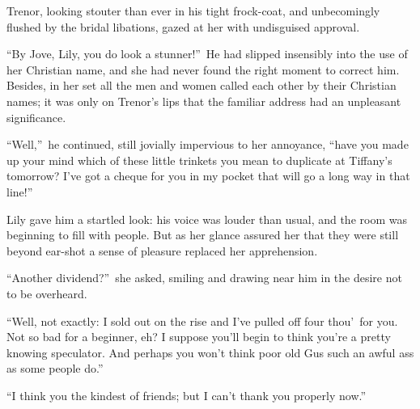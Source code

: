 \documentclass[12pt,a4paper]{book}
\begin{document}
Trenor, looking stouter than ever in his tight frock-coat, and
unbecomingly flushed by the bridal libations, gazed at her with
undisguised approval.





``By Jove, Lily, you do look a stunner!''\ He had slipped insensibly
into the use of her Christian name, and she had never found the
right moment to correct him. Besides, in her set all the men and
women called each other by their Christian names; it was only on
Trenor's lips that the familiar address had an unpleasant
significance.





``Well,''\ he continued, still jovially impervious to her annoyance,
``have you made up your mind which of these little trinkets you
mean to duplicate at Tiffany's tomorrow? I've got a cheque for
you in my pocket that will go a long way in that line!''





Lily gave him a startled look: his voice was louder than usual,
and the room was beginning to fill with people. But as her glance
assured her that they were still beyond ear-shot a sense of
pleasure replaced her apprehension.





``Another dividend?''\ she asked, smiling and drawing near him in
the desire not to be overheard.





``Well, not exactly: I sold out on the rise and I've pulled off
four thou'\ for you. Not so bad for a beginner, eh? I suppose
you'll begin to think you're a pretty knowing speculator. And
perhaps you won't think poor old Gus such an awful ass as some
people do.''





``I think you the kindest of friends; but I can't thank you
properly now.''
\end{document}
